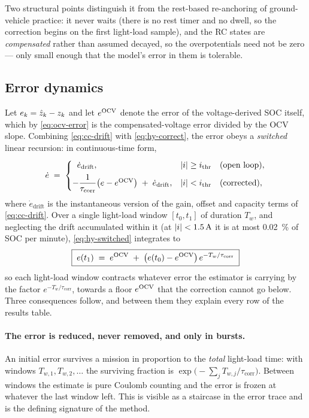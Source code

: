 Two structural points distinguish it from the rest-based re-anchoring of ground-vehicle practice: it
never waits (there is no rest timer and no dwell, so the correction begins on the first light-load
sample), and the RC states are \emph{compensated} rather than assumed decayed, so the
overpotentials need not be zero --- only small enough that the model's error in them is tolerable.

\subsection{Error dynamics}
Let $e_k = \hat{z}_k - z_k$ and let $e^{\mathrm{OCV}}$ denote the error of the voltage-derived SOC
itself, which by \eqref{eq:ocv-error} is the compensated-voltage error divided by the OCV slope.
Combining \eqref{eq:cc-drift} with \eqref{eq:hy-correct}, the error obeys a \emph{switched} linear
recursion: in continuous-time form,
\begin{equation}
\dot e \;=\;
\begin{cases}
\;\;\dot e_{\text{drift}}, & \left\lvert i \right\rvert \ge i_{\text{thr}} \quad\text{(open loop)},\\[4pt]
-\dfrac{1}{\tau_{\text{corr}}}\bigl(e - e^{\mathrm{OCV}}\bigr) \;+\; \dot e_{\text{drift}},
 & \left\lvert i \right\rvert < i_{\text{thr}} \quad\text{(corrected)},
\end{cases}
\label{eq:hy-switched}
\end{equation}
where $\dot e_{\text{drift}}$ is the instantaneous version of the gain, offset and capacity terms of
\eqref{eq:cc-drift}. Over a single light-load window $[t_0,t_1]$ of duration $T_w$, and neglecting
the drift accumulated within it (at $\left\lvert i \right\rvert<\SI{1.5}{\ampere}$ it is at most
\SI{0.02}{\percent} of SOC per minute), \eqref{eq:hy-switched} integrates to
\begin{equation}
\boxed{\;
e(t_1) \;=\; e^{\mathrm{OCV}} \;+\; \bigl(e(t_0) - e^{\mathrm{OCV}}\bigr)\,e^{-T_w/\tau_{\text{corr}}} \;}
\label{eq:hy-window}
\end{equation}
so each light-load window contracts whatever error the estimator is carrying by the factor
$e^{-T_w/\tau_{\text{corr}}}$, towards a floor $e^{\mathrm{OCV}}$ that the correction cannot go below.
Three consequences follow, and between them they explain every row of the results table.

\paragraph{The error is reduced, never removed, and only in bursts.} An initial error survives a
mission in proportion to the \emph{total} light-load time: with windows $T_{w,1},T_{w,2},\dots$ the
surviving fraction is $\exp\bigl(-\sum_j T_{w,j}/\tau_{\text{corr}}\bigr)$. Between windows the
estimate is pure Coulomb counting and the error is frozen at whatever the last window left. This is
visible as a staircase in the error trace and is the defining signature of the method.

